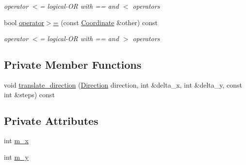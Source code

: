 \begin{DoxyCompactItemize}
\begin{DoxyCompactList}\small\item\em operator $<$= logical-\/\-O\-R with == and $<$ operators \end{DoxyCompactList}\item 
bool \hyperlink{classCourse_1_1Coordinate_abdb1bf21cc8cb30784c88311d9034780}{operator$>$=} (const \hyperlink{classCourse_1_1Coordinate}{Coordinate} \&other) const 
\begin{DoxyCompactList}\small\item\em operator $<$= logical-\/\-O\-R with == and $>$ operators \end{DoxyCompactList}\end{DoxyCompactItemize}
\subsection*{Private Member Functions}
\begin{DoxyCompactItemize}
\item 
void \hyperlink{classCourse_1_1Coordinate_a220f0109fcc4f7269f8c7e73580e8d01}{translate\-\_\-direction} (\hyperlink{namespaceCourse_aad6b2bd7587f1ac9c29b6693cc653931}{Direction} direction, int \&delta\-\_\-x, int \&delta\-\_\-y, const int \&steps) const 
\end{DoxyCompactItemize}
\subsection*{Private Attributes}
\begin{DoxyCompactItemize}
\item 
int \hyperlink{classCourse_1_1Coordinate_ae82deff5e92295185e9a32256b970dac}{m\-\_\-x}
\item 
int \hyperlink{classCourse_1_1Coordinate_a387f476965085a956cbb512315488f13}{m\-\_\-y}
\end{DoxyCompactItemize}


